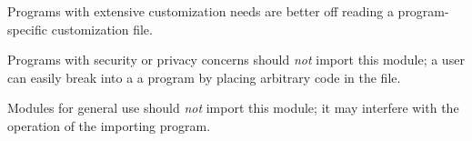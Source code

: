 Programs with extensive customization needs are better off reading a
program-specific customization file.

Programs with security or privacy concerns should \emph{not} import
this module; a user can easily break into a a program by placing
arbitrary code in the  file.

Modules for general use should \emph{not} import this module; it may
interfere with the operation of the importing program.

\begin{seealso}
\end{seealso}
